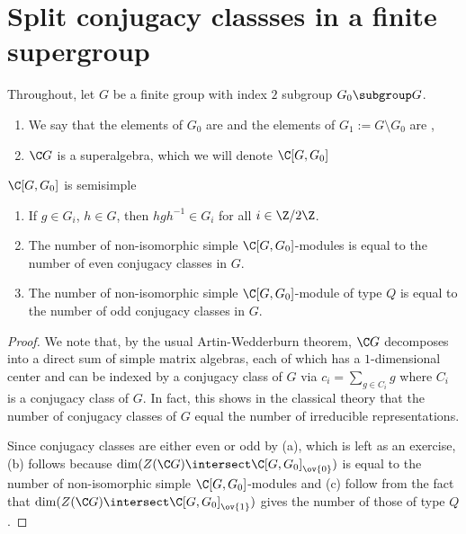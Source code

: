 \documentclass[11pt,leqno,oneside]{amsbook}
\numberwithin{thm}{section}
\begin{document}
\section{Split conjugacy classses in a finite supergroup}
Throughout, let \(G\) be a finite group with index \(2\) subgroup
\(G_0 \subgroup G\).
\begin{defn}
  \begin{enumerate}
  \item We say that the elements of \(G_0\) are  and the
  elements of \(G_1 := G \setminus G_0\) are ,
  \item \(\C G\) is a superalgebra, which we will denote \(\C[G,G_0]\)
  \end{enumerate}
\end{defn}
\begin{thm}
  \(\C[G,G_0]\) is semisimple
\end{thm}
\begin{prop}
  \begin{enumerate}
  \item If \(g \in G_i\), \(h \in G\), then \(hgh^{-1} \in G_i\) for
    all \(i \in \Z/2\Z\).
  \item The number of non-isomorphic simple \(\C[G,G_0]\)-modules is
    equal to the number of even conjugacy classes in \(G\).
  \item The number of non-isomorphic simple \(\C[G,G_0]\)-module of
    type \(Q\) is equal to the number of odd conjugacy classes in \(G\).
  \end{enumerate}
\end{prop}
\begin{proof}
  We note that, by the usual Artin-Wedderburn theorem, \(\C G\)
  decomposes into a direct sum of simple matrix algebras, each of
  which has a \(1\)-dimensional center and can be indexed by a
  conjugacy class of \(G\) via \(c_i = \sum_{g \in C_i} g\) where
  \(C_i\) is a conjugacy class of \(G\). In fact, this shows in the
  classical theory that the number of conjugacy classes of \(G\) equal
  the number of irreducible representations.
  
  Since conjugacy classes are either even or odd by (a), which is left
  as an exercise, (b) follows
  because \(\dim (Z(\C G) \intersect 
  \C[G,G_0]_{\ov{0}})\) is equal to the number of non-isomorphic
  simple \(\C[G,G_0]\)-modules and (c) follow from the fact that \(\dim(Z(\C G)
  \intersect \C[G,G_0]_{\ov{1}})\) gives the number of those of type \(Q\).
\end{proof}
\end{document}

